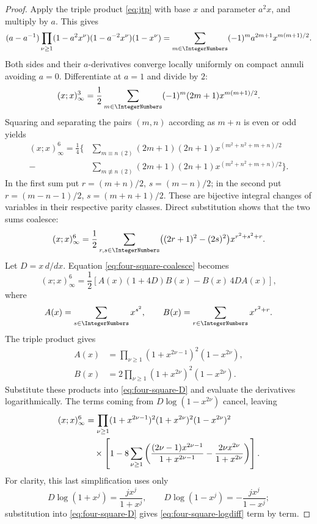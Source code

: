 \documentclass[11pt,oneside]{article}
\theoremstyle{definition}
\begin{document}
\begin{proof}
Apply the triple product \eqref{eq:jtp} with base $x$ and parameter
$a^2x$, and multiply by $a$.  This gives
\begin{equation}\label{eq:four-square-start}
 (a-a^{-1})\prod_{\nu\ge1}
 (1-a^2x^\nu)(1-a^{-2}x^\nu)(1-x^\nu)
 =
 \sum_{m\in\IntegerNumbers}(-1)^ma^{2m+1}x^{m(m+1)/2}.
\end{equation}
Both sides and their $a$-derivatives converge locally uniformly on compact
annuli avoiding $a=0$.  Differentiate at $a=1$ and divide by $2$:
\begin{equation}\label{eq:jacobi-cube}
 (x;x)_\infty^3
 =\frac12\sum_{m\in\IntegerNumbers}(-1)^m(2m+1)x^{m(m+1)/2}.
\end{equation}
Squaring and separating the pairs $(m,n)$ according as $m+n$ is even or
odd yields
\begin{align*}
 (x;x)_\infty^6
 =\frac14\biggl\{
 &\sum_{m\equiv n\ (2)}(2m+1)(2n+1)
     x^{(m^2+n^2+m+n)/2}\\
 -&\sum_{m\not\equiv n\ (2)}(2m+1)(2n+1)
     x^{(m^2+n^2+m+n)/2}
 \biggr\}.
\end{align*}
In the first sum put
$r=(m+n)/2$, $s=(m-n)/2$; in the second put
$r=(m-n-1)/2$, $s=(m+n+1)/2$.  These are bijective integral changes of
variables in their respective parity classes.  Direct substitution shows
that the two sums coalesce:
\begin{equation}\label{eq:four-square-coalesce}
 (x;x)_\infty^6
 =\frac12\sum_{r,s\in\IntegerNumbers}
 \bigl((2r+1)^2-(2s)^2\bigr)x^{r^2+s^2+r}.
\end{equation}
Let $D=x\,d/dx$.  Equation \eqref{eq:four-square-coalesce} becomes
\begin{equation}\label{eq:four-square-D}
 (x;x)_\infty^6
 =\frac12\left[
 A(x)(1+4D)B(x)-B(x)\,4D A(x)
 \right],
\end{equation}
where
\[
 A(x)=\sum_{s\in\IntegerNumbers}x^{s^2},\qquad
 B(x)=\sum_{r\in\IntegerNumbers}x^{r^2+r}.
\]
The triple product gives
\begin{align}
 A(x)&=\prod_{\nu\ge1}
 (1+x^{2\nu-1})^2(1-x^{2\nu}),\label{eq:A-product}\\
 B(x)&=2\prod_{\nu\ge1}
 (1+x^{2\nu})^2(1-x^{2\nu}).\label{eq:B-product}
\end{align}
Substitute these products into \eqref{eq:four-square-D} and evaluate the
derivatives logarithmically.  The terms coming from
$D\log(1-x^{2\nu})$ cancel, leaving
\begin{align}
 (x;x)_\infty^6
 &=
 \prod_{\nu\ge1}
 (1+x^{2\nu-1})^2(1+x^{2\nu})^2(1-x^{2\nu})^2
 \notag\\
 &\quad\times
 \left[
 1-8\sum_{\nu\ge1}\left(
 \frac{(2\nu-1)x^{2\nu-1}}{1+x^{2\nu-1}}
 -\frac{2\nu x^{2\nu}}{1+x^{2\nu}}
 \right)
 \right].\label{eq:four-square-logdiff}
\end{align}
For clarity, this last simplification uses only
\[
 D\log(1+x^j)=\frac{j x^j}{1+x^j},
 \qquad
 D\log(1-x^j)=-\frac{j x^j}{1-x^j};
\]
substitution into \eqref{eq:four-square-D} gives
\eqref{eq:four-square-logdiff} term by term.


\end{proof}
\end{document}
